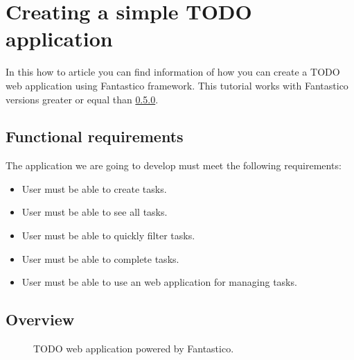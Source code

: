 \documentclass[letterpaper,10pt,english]{sphinxmanual}
\begin{document}
\section{Creating a simple TODO application}
\label{how_to/todo/index:creating-a-simple-todo-application}\label{how_to/todo/index::doc}
In this how to article you can find information of how you can create a TODO web application using Fantastico framework. This
tutorial works with Fantastico versions greater or equal than \href{http://pypi.python.org/pypi/fantastico/0.5.0}{0.5.0}.


\subsection{Functional requirements}
\label{how_to/todo/index:functional-requirements}
The application we are going to develop must meet the following requirements:
\begin{itemize}
\item {} 
User must be able to create tasks.

\item {} 
User must be able to see all tasks.

\item {} 
User must be able to quickly filter tasks.

\item {} 
User must be able to complete tasks.

\item {} 
User must be able to use an web application for managing tasks.

\end{itemize}


\subsection{Overview}
\label{how_to/todo/index:overview}\begin{figure}[htbp]
\centering
\capstart

\caption{TODO web application powered by Fantastico.}\end{figure}
\end{document}
